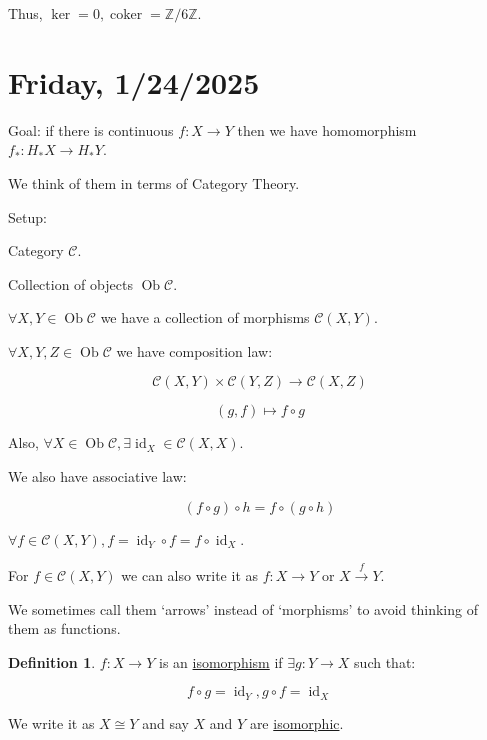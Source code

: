 \documentclass{article}
\theoremstyle{definition}
\newtheorem*{definition}{Definition}
\begin{document}
    Thus, \(\ker = 0, \operatorname{coker} = \mathbb{Z} / 6\mathbb{Z}\).

    \section*{Friday, 1/24/2025}
    
    Goal: if there is continuous \(f: X \to Y\) then we have homomorphism \(f_{\ast} : H_{\ast} X \to H_{\ast} Y\).
    
    We think of them in terms of Category Theory.

    Setup:

    Category \(\mathcal{C}\).

    Collection of objects \(\operatorname{Ob} \mathcal{C}\).

    \(\forall X, Y \in \operatorname{Ob} \mathcal{C}\) we have a collection of morphisms \(\mathcal{C}(X,Y)\).

    \(\forall X,Y,Z \in \operatorname{Ob} \mathcal{C}\) we have composition law:

    \[
        \mathcal{C}(X,Y) \times \mathcal{C}(Y,Z) \to \mathcal{C}(X,Z)
    \]

    \[
        (g,f) \mapsto f \circ g
    \]

    Also, \(\forall X\in \operatorname{Ob} \mathcal{C}, \exists \operatorname{id}_{X} \in \mathcal{C}(X,X)\).

    We also have associative law:

    \[
        (f \circ g) \circ h = f \circ (g \circ h)
    \]

    \(\forall f\in \mathcal{C}(X,Y), f = \operatorname{id}_{Y} \circ f = f \circ \operatorname{id}_{X}\).

    For \(f\in \mathcal{C}(X,Y)\) we can also write it as \(f: X \to Y\) or \(X \xrightarrow{f} Y\).

    We sometimes call them `arrows' instead of `morphisms' to avoid thinking of them as functions.

    \begin{center}
    \end{center}

    \begin{definition}
        \(f: X \to Y\) is an \underline{isomorphism} if \(\exists g: Y \to X\) such that:

        \[
            f \circ g = \operatorname{id}_{Y}, g \circ f = \operatorname{id}_{X} 
        \]

        We write it as \(X \cong Y\) and say \(X\) and \(Y\) are \underline{isomorphic}.
    \end{definition}
\end{document}
